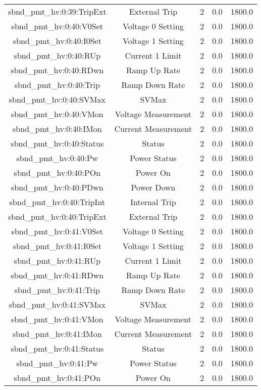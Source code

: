 \begin{table}[ptb]
\begin{tabular}{c | c c c c}
sbnd_pmt_hv:0:39:TripExt & External Trip & 2 & 0.0 & 1800.0\\ 
sbnd_pmt_hv:0:40:V0Set & Voltage 0 Setting & 2 & 0.0 & 1800.0\\ 
sbnd_pmt_hv:0:40:I0Set & Voltage 1 Setting & 2 & 0.0 & 1800.0\\ 
sbnd_pmt_hv:0:40:RUp & Current 1 Limit & 2 & 0.0 & 1800.0\\ 
sbnd_pmt_hv:0:40:RDwn & Ramp Up Rate & 2 & 0.0 & 1800.0\\ 
sbnd_pmt_hv:0:40:Trip & Ramp Down Rate & 2 & 0.0 & 1800.0\\ 
sbnd_pmt_hv:0:40:SVMax & SVMax & 2 & 0.0 & 1800.0\\ 
sbnd_pmt_hv:0:40:VMon & Voltage Measurement & 2 & 0.0 & 1800.0\\ 
sbnd_pmt_hv:0:40:IMon & Current Measurement & 2 & 0.0 & 1800.0\\ 
sbnd_pmt_hv:0:40:Status & Status & 2 & 0.0 & 1800.0\\ 
sbnd_pmt_hv:0:40:Pw & Power Status & 2 & 0.0 & 1800.0\\ 
sbnd_pmt_hv:0:40:POn & Power On & 2 & 0.0 & 1800.0\\ 
sbnd_pmt_hv:0:40:PDwn & Power Down & 2 & 0.0 & 1800.0\\ 
sbnd_pmt_hv:0:40:TripInt & Internal Trip & 2 & 0.0 & 1800.0\\ 
sbnd_pmt_hv:0:40:TripExt & External Trip & 2 & 0.0 & 1800.0\\ 
sbnd_pmt_hv:0:41:V0Set & Voltage 0 Setting & 2 & 0.0 & 1800.0\\ 
sbnd_pmt_hv:0:41:I0Set & Voltage 1 Setting & 2 & 0.0 & 1800.0\\ 
sbnd_pmt_hv:0:41:RUp & Current 1 Limit & 2 & 0.0 & 1800.0\\ 
sbnd_pmt_hv:0:41:RDwn & Ramp Up Rate & 2 & 0.0 & 1800.0\\ 
sbnd_pmt_hv:0:41:Trip & Ramp Down Rate & 2 & 0.0 & 1800.0\\ 
sbnd_pmt_hv:0:41:SVMax & SVMax & 2 & 0.0 & 1800.0\\ 
sbnd_pmt_hv:0:41:VMon & Voltage Measurement & 2 & 0.0 & 1800.0\\ 
sbnd_pmt_hv:0:41:IMon & Current Measurement & 2 & 0.0 & 1800.0\\ 
sbnd_pmt_hv:0:41:Status & Status & 2 & 0.0 & 1800.0\\ 
sbnd_pmt_hv:0:41:Pw & Power Status & 2 & 0.0 & 1800.0\\ 
sbnd_pmt_hv:0:41:POn & Power On & 2 & 0.0 & 1800.0\\ 

\end{tabular}
\end{table}
